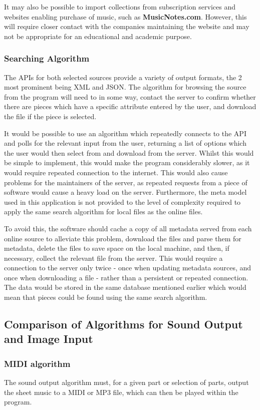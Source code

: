 It may also be possible to import collections from subscription services and websites enabling purchase of music, such as \textbf{MusicNotes.com}. However, this will require closer contact with the companies maintaining the website and may not be appropriate for an educational and academic purpose.

\subsubsection{Searching Algorithm}
The APIs for both selected sources provide a variety of output formats, the 2 most prominent being XML and JSON. The algorithm for browsing the source from the program will need to in some way, contact the server to confirm whether there are pieces which have a specific attribute entered by the user, and download the file if the piece is selected.

It would be possible to use an algorithm which repeatedly connects to the API and polls for the relevant input from the user, returning a list of options which the user would then select from and download from the server. Whilst this would be simple to implement, this would make the program considerably slower, as it would require repeated connection to the internet. This would also cause problems for the maintainers of the server, as repeated requests from a piece of software would cause a heavy load on the server. Furthermore, the meta model used in this application is not provided to the level of complexity required to apply the same search algorithm for local files as the online files.

To avoid this, the software should cache a copy of all metadata served from each online source to alleviate this problem, download the files and parse them for metadata, delete the files to save space on the local machine, and then, if necessary, collect the relevant file from the server. This would require a connection to the server only twice - once when updating metadata sources, and once when downloading a file - rather than a persistent or repeated connection. The data would be stored in the same database mentioned earlier which would mean that pieces could be found using the same search algorithm.


\subsection{Comparison of Algorithms for Sound Output and Image Input}
\subsubsection{MIDI algorithm}
The sound output algorithm must, for a given part or selection of parts, output the sheet music to a MIDI or MP3 file, which can then be played within the program. 

